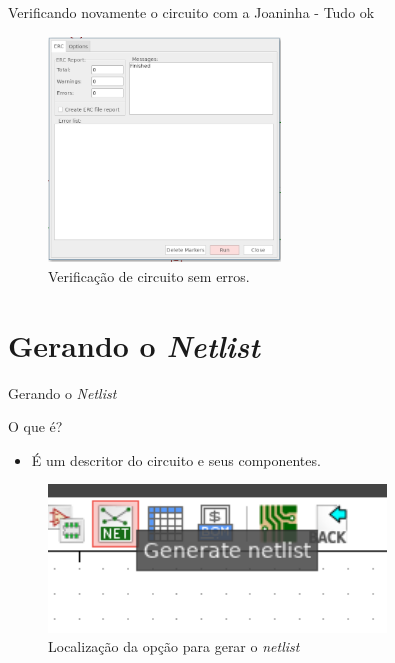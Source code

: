 \documentclass{beamer}
\begin{document}
\begin{frame}{Verificando novamente o circuito com a Joaninha - Tudo ok}
	\begin{figure}
		\centering
		\includegraphics[width=0.55\textwidth]{Imagens/14_joaninha_sem_erro.png}
		\caption{Verificação de circuito sem erros.}
	\end{figure}
\end{frame}

\section{Gerando o \textit{Netlist}}
\begin{frame}{Gerando o \textit{Netlist}}
	\begin{block}{O que é?}
		\begin{itemize}
			\item É um descritor do circuito e seus componentes.
		\end{itemize}
	\end{block}
	\begin{figure}
		\centering
		\includegraphics[width=0.8\textwidth]{Imagens/15_netlist.png}
		\caption{Localização da opção para gerar o \textit{netlist}}
	\end{figure}
\end{frame}
\end{document}
